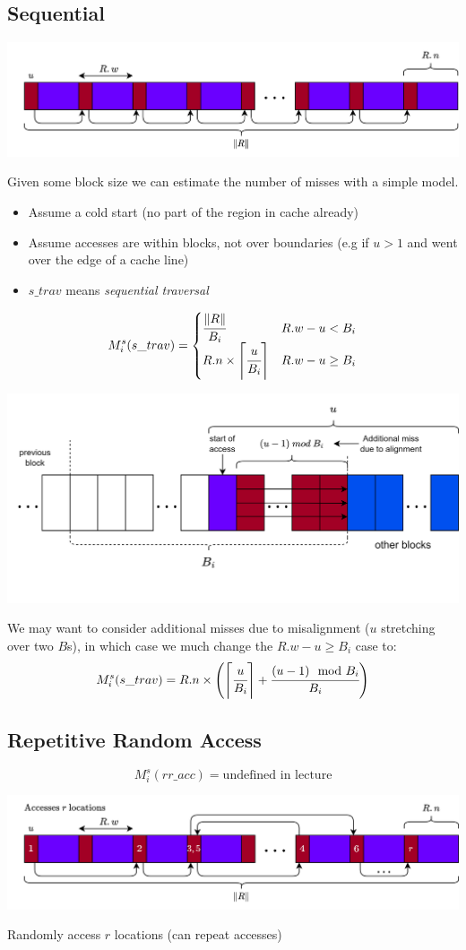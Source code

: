 \subsection{Sequential}
\begin{center}
    \includegraphics[width=.8\textwidth]{modelling/images/sequential_access_u_1.drawio.png}
\end{center}
Given some block size we can estimate the number of misses with a simple model.
\begin{itemize}
    \item Assume a cold start (no part of the region in cache already)
    \item Assume accesses are within blocks, not over boundaries (e.g if $u > 1$ and went over the edge of a cache line)
    \item $s\_trav$ means \textit{sequential traversal}
\end{itemize}
\[M_i^s(s\_trav) = \begin{cases}
    \cfrac{\| R \|}{B_i} & R.w - u < B_i \\
    R.n \times \left\lceil \cfrac{u}{B_i} \right\rceil & R.w - u \geq B_i \\
\end{cases}\]
\begin{center}
    \includegraphics[width=.7\textwidth]{modelling/images/alignment_miss.drawio.png}
\end{center}
We may want to consider additional misses due to misalignment ($u$ stretching over two $B$s), in which case we much change the $R.w - u \geq B_i$ case to:
\[M_i^s(s\_trav) = R.n \times \left(\left\lceil \cfrac{u}{B_i} \right\rceil + \cfrac{(u-1) \mod B_i}{B_i} \right)\]

\subsection{Repetitive Random Access}
\[M_i^s(rr\_acc) = \text{undefined in lecture}\]
\begin{center}
    \includegraphics[width=.8\textwidth]{modelling/images/random_access.drawio.png}
\end{center}
Randomly access $r$ locations (can repeat accesses)

